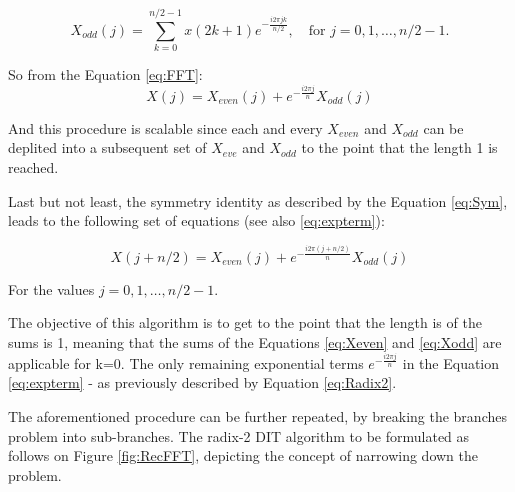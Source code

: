 {{\begin{equation}
    X_{odd}(j) =  \sum_{k=0}^{n/2-1} x(2k+1) e^{ - \frac{i 2\pi jk}{n/2} }, \quad \text{for } j = 0,1,\dots,n/2-1.
    \label{eq:Xodd}
\end{equation}

So from the Equation \eqref{eq:FFT}:
\begin{equation}
    X(j) =  X_{even}(j) + e^{- \frac{i 2\pi j}{n}} X_{odd}(j)
    \label{eq:expterm}
\end{equation}

And this procedure is scalable since each and every \( X_{even} \) and \( X_{odd} \) can be deplited into a subsequent set of \( X_{eve} \) and \( X_{odd} \) to the point that the length 1 is reached.

Last but not least, the symmetry identity as described by the Equation \eqref{eq:Sym}, leads to the following set of equations (see also \eqref{eq:expterm}):

\begin{equation}
    X(j+n/2) =  X_{even}(j) + e^{- \frac{i 2\pi (j+n/2)}{n}} X_{odd}(j)
\end{equation}

For the values \( j = 0,1,\dots,n/2-1 \).

The objective of this algorithm is to get to the point that the length is of the sums is 1, meaning that the sums of the Equations \eqref{eq:Xeven} and \eqref{eq:Xodd} are applicable for k=0. The only  remaining exponential terms  \( e^{- \frac{i 2\pi j}{n}} \) in the Equation \eqref{eq:expterm} - as previously described by Equation \eqref{eq:Radix2}.

The aforementioned procedure can be further repeated, by breaking the branches problem into sub-branches. The radix-2 DIT algorithm to be formulated as follows on Figure \ref{fig:RecFFT}, depicting the concept of narrowing down the problem. 

\begin{figure}[h]
    \centering
\end{figure}}}
